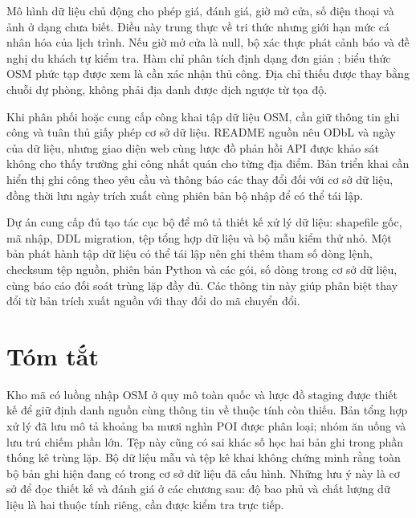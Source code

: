 Mô hình dữ liệu chủ động cho phép giá, đánh giá, giờ mở cửa, số điện thoại và ảnh ở dạng chưa biết. Điều này trung thực về tri thức nhưng giới hạn mức cá nhân hóa của lịch trình. Nếu giờ mở cửa là null, bộ xác thực phát cảnh báo và đề nghị du khách tự kiểm tra. Hàm chỉ phân tích định dạng đơn giản ; biểu thức OSM phức tạp được xem là cần xác nhận thủ công. Địa chỉ thiếu được thay bằng chuỗi dự phòng, không phải địa danh được dịch ngược từ tọa độ.

Khi phân phối hoặc cung cấp công khai tập dữ liệu OSM, cần giữ thông tin ghi công và tuân thủ giấy phép cơ sở dữ liệu. README nguồn nêu ODbL và ngày của dữ liệu, nhưng giao diện web cùng lược đồ phản hồi API được khảo sát không cho thấy trường ghi công nhất quán cho từng địa điểm. Bản triển khai cần hiển thị ghi công theo yêu cầu và thông báo các thay đổi đối với cơ sở dữ liệu, đồng thời lưu ngày trích xuất cùng phiên bản bộ nhập để có thể tái lập.

Dự án cung cấp đủ tạo tác cục bộ để mô tả thiết kế xử lý dữ liệu: shapefile gốc, mã nhập, DDL migration, tệp tổng hợp dữ liệu và bộ mẫu kiểm thử nhỏ. Một bản phát hành tập dữ liệu có thể tái lập nên ghi thêm tham số dòng lệnh, checksum tệp nguồn, phiên bản Python và các gói, số dòng trong cơ sở dữ liệu, cùng báo cáo đối soát trùng lặp đầy đủ. Các thông tin này giúp phân biệt thay đổi từ bản trích xuất nguồn với thay đổi do mã chuyển đổi.

\section{Tóm tắt}

Kho mã có luồng nhập OSM ở quy mô toàn quốc và lược đồ staging được thiết kế để giữ định danh nguồn cùng thông tin về thuộc tính còn thiếu. Bản tổng hợp xử lý đã lưu mô tả khoảng ba mươi nghìn POI được phân loại; nhóm ăn uống và lưu trú chiếm phần lớn. Tệp này cũng có sai khác số học hai bản ghi trong phần thống kê trùng lặp. Bộ dữ liệu mẫu và tệp kê khai không chứng minh rằng toàn bộ bản ghi hiện đang có trong cơ sở dữ liệu đã cấu hình. Những lưu ý này là cơ sở để đọc thiết kế và đánh giá ở các chương sau: độ bao phủ và chất lượng dữ liệu là hai thuộc tính riêng, cần được kiểm tra trực tiếp.
